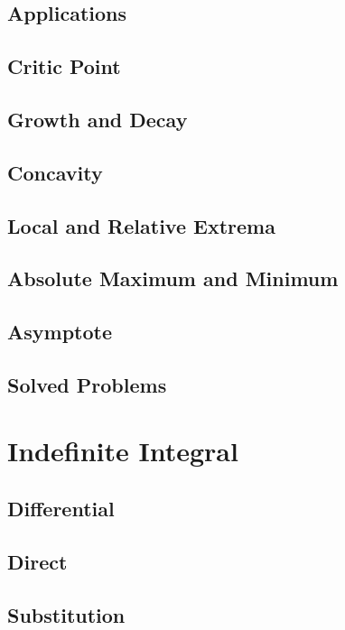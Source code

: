 \documentclass[a4paper,12pt]{article}
\begin{document}
\subsection{Applications}
\label{sec:orgfaec3bc}
\subsection{Critic Point}
\label{sec:org5d14c9b}
\subsection{Growth and Decay}
\label{sec:orgfbd09a9}
\subsection{Concavity}
\label{sec:org1957cd2}
\subsection{Local and Relative Extrema}
\label{sec:org4e872c7}
\subsection{Absolute Maximum and Minimum}
\label{sec:orgde63d6c}
\subsection{Asymptote}
\label{sec:org6c95a58}
\subsection{Solved Problems}
\label{sec:org794ad8e}

\newpage

\section{Indefinite Integral}
\label{sec:orgc07b5ce}
\subsection{Differential}
\label{sec:org5f608cc}
\subsection{Direct}
\label{sec:orga7e8ebe}
\subsection{Substitution}
\label{sec:org5277ea5}
\end{document}
